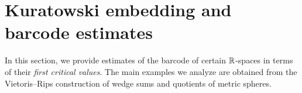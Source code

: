 
\section{Kuratowski embedding and barcode estimates}\label{s:barcodes}

In this section, we provide estimates of the barcode of certain $\mathbb{R}$-spaces in terms of their \textit{first critical values}. 
The main examples we analyze are obtained from the Vietoris--Rips construction of wedge sums and quotients of metric spheres.




